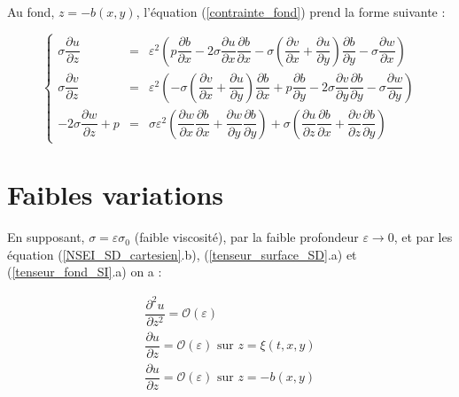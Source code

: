 \documentclass[10pt,a4paper]{amsart}
\begin{document}
Au fond, $z=-b(x,y)$, l'équation (\ref{contrainte_fond}) prend la forme suivante :

\begin{equation}\label{tenseur_fond_SI}
\left\{
\begin{array}{rcl}
\sigma \dfrac{\partial u}{\partial z} & = & \varepsilon^2 \left( p\dfrac{\partial b}{\partial x} - 2 \sigma \dfrac{\partial u}{\partial x}\dfrac{\partial b}{\partial x} - \sigma \left( \dfrac{\partial v}{\partial x} + \dfrac{\partial u}{\partial y} \right) \dfrac{\partial b}{\partial y} - \sigma \dfrac{\partial w}{\partial x} \right)\\

\sigma \dfrac{\partial v}{\partial z} & = & \varepsilon^2 \left( -\sigma \left( \dfrac{\partial v}{\partial x} + \dfrac{\partial u}{\partial y} \right)\dfrac{\partial b}{\partial x} + p\dfrac{\partial b}{\partial y} - 2 \sigma \dfrac{\partial v}{\partial y} \dfrac{\partial b}{\partial y} - \sigma \dfrac{\partial w}{\partial y} \right)\\

-2 \sigma \dfrac{\partial w}{\partial z} + p & = & \sigma \varepsilon^2 \left( \dfrac{\partial w}{\partial x} \dfrac{\partial b}{\partial x} +  \dfrac{\partial w}{\partial y} \dfrac{\partial b}{\partial y} \right) + \sigma \left( \dfrac{\partial u}{\partial z} \dfrac{\partial b}{\partial x} + \dfrac{\partial v}{\partial z} \dfrac{\partial b}{\partial y} \right)

\end{array}
\right.
\end{equation}



\section{Faibles variations}

En supposant, $\sigma = \varepsilon \sigma_0$ (faible viscosité), par la faible profondeur $\varepsilon \longrightarrow 0$, et par les équation (\ref{NSEI_SD_cartesien}.b), (\ref{tenseur_surface_SD}.a) et (\ref{tenseur_fond_SI}.a) on a :

\begin{eqnarray}
\label{faible_var_u}
\dfrac{\partial^2 u}{\partial z^2} = \mathcal{O} \left( \varepsilon \right)\\
\label{faible_var_u_surface}
\dfrac{\partial u}{\partial z} = \mathcal{O} \left( \varepsilon \right) \text{ sur } z=\xi(t,x,y) \\
\label{faible_var_u_fond}
\dfrac{\partial u}{\partial z} = \mathcal{O} \left( \varepsilon \right) \text{ sur } z=-b(x,y)
\end{eqnarray}
\end{document}
